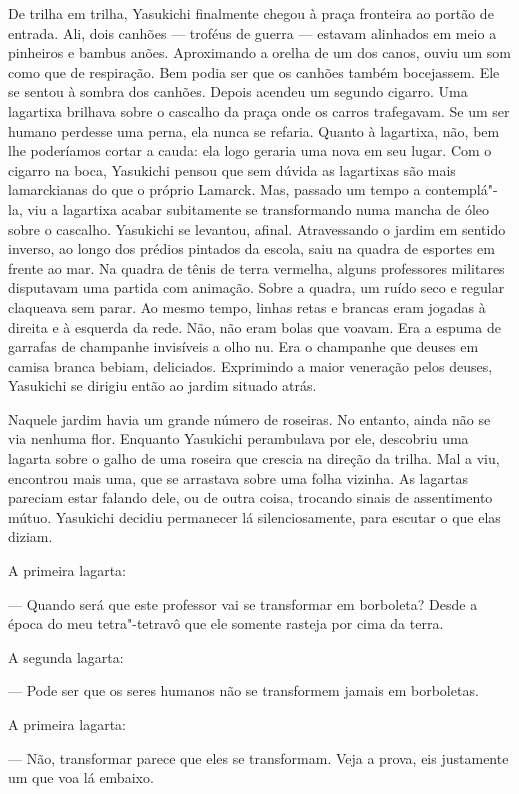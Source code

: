 De trilha em trilha, Yasukichi finalmente chegou à praça fronteira ao
portão de entrada. Ali, dois canhões --- troféus de guerra --- estavam
alinhados em meio a pinheiros e bambus anões. Aproximando a orelha de
um dos canos, ouviu um som como que de respiração. Bem podia ser que os
canhões também bocejassem. Ele se sentou à sombra dos canhões. Depois
acendeu um segundo cigarro. Uma lagartixa brilhava sobre o cascalho da
praça onde os carros trafegavam. Se um ser humano perdesse uma perna,
ela nunca se refaria. Quanto à lagartixa, não, bem lhe poderíamos
cortar a cauda: ela logo geraria uma nova em seu lugar. Com o cigarro
na boca, Yasukichi pensou que sem dúvida as lagartixas são mais
lamarckianas do que o próprio Lamarck. Mas, passado um tempo a
contemplá"-la, viu a lagartixa acabar subitamente se transformando numa
mancha de óleo sobre o cascalho. Yasukichi se levantou, afinal.
Atravessando o jardim em sentido inverso, ao longo dos prédios pintados
da escola, saiu na quadra de esportes em frente ao mar. Na quadra de
tênis de terra vermelha, alguns professores militares disputavam uma
partida com animação. Sobre a quadra, um ruído seco e regular claqueava
sem parar. Ao mesmo tempo, linhas retas e brancas eram jogadas à
direita e à esquerda da rede. Não, não eram bolas que voavam. Era a
espuma de garrafas de champanhe invisíveis a olho nu. Era o champanhe
que deuses em camisa branca bebiam, deliciados. Exprimindo a maior
veneração pelos deuses, Yasukichi se dirigiu então ao jardim situado atrás.

Naquele jardim havia um grande número de roseiras. No entanto, ainda não
se via nenhuma flor. Enquanto Yasukichi perambulava por ele, descobriu
uma lagarta sobre o galho de uma roseira que crescia na direção da
trilha. Mal a viu, encontrou mais uma, que se arrastava sobre uma folha
vizinha. As lagartas pareciam estar falando dele, ou de outra coisa,
trocando sinais de assentimento mútuo. Yasukichi decidiu permanecer lá
silenciosamente, para escutar o que elas diziam.

A primeira lagarta:

--- Quando será que este professor vai se transformar em borboleta? 
Desde a época do meu tetra"-tetravô que ele somente rasteja por cima da terra.

A segunda lagarta:

--- Pode ser que os seres humanos não se transformem jamais em borboletas.

A primeira lagarta:

--- Não, transformar parece que eles se transformam. Veja a prova, eis
justamente um que voa lá embaixo.

